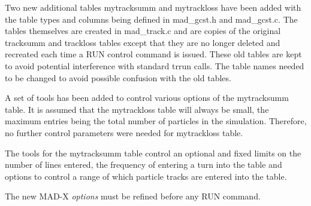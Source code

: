 Two new additional tables mytracksumm and mytrackloss have been added
with the table types and columns being defined in mad\_gcst.h and
mad\_gcst.c. The tables themselves are created in mad\_track.c and are
copies of the original tracksumm and trackloss tables except that they
are no longer deleted and recreated each time a RUN control command is
issued. These old tables are kept to avoid potential interference with
standard trrun calls. The table names needed to be changed to avoid
possible confusion with the old tables.

A set of tools has been added to control various options of the
mytracksumm table. It is assumed that the mytrackloss table will
always be small, the maximum entries being the total number of
particles in the simulation. Therefore, no further control parameters
were needed for mytrackloss table.

The tools for the mytracksumm table control an optional and fixed
limits on the number of lines entered, the frequency of entering a
turn into the table and options to control a range of which particle
tracks are entered into the table.


The new MAD-X {\it options}  must be refined before any RUN command.

